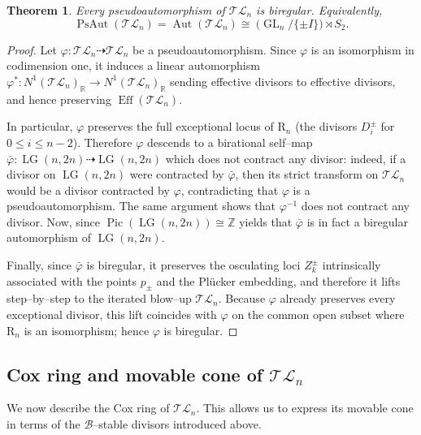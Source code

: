 \documentclass[10pt]{amsart}
\newtheorem{theorem}{Theorem}[section]
\theoremstyle{definition}
\newcommand{\R}{\mathbb{R}}
\newcommand{\Z}{\mathbb{Z}}
\newcommand{\Pic}{\operatorname{Pic}}
\newcommand{\Eff}{\operatorname{Eff}}
\newcommand{\PsAut}{\operatorname{PsAut}}
\newcommand{\Aut}{\operatorname{Aut}}
\newcommand{\LG}{\operatorname{LG}}
\newcommand{\TL}{\mathcal{TL}}
\newcommand{\GL}{\operatorname{GL}}
\newcommand{\RL}{\mathrm{R}}
\theoremstyle{plain} %
\begin{document}
\begin{theorem}\label{thm:PsAut-equals-Aut}
Every pseudoautomorphism of $\TL_n$ is biregular.  Equivalently,
\[
\PsAut(\TL_n)=\Aut(\TL_n) \cong\ \bigl(\GL_n/\{\pm I\}\bigr)\rtimes S_2.
\]
\end{theorem}

\begin{proof}
Let $\varphi:\TL_n\dashrightarrow \TL_n$ be a pseudoautomorphism.  Since $\varphi$ is an
isomorphism in codimension one, it induces a linear automorphism $\varphi^*:N^1(\TL_n)_\R\longrightarrow N^1(\TL_n)_\R$ sending effective divisors to effective divisors, and hence preserving
$\Eff(\TL_n)$.

In particular, $\varphi$ preserves the full exceptional locus of $\RL_n$ (the divisors
$D_i^\pm$ for $0\le i\le n-2$).  Therefore $\varphi$ descends to a birational self--map $\bar\varphi:\LG(n,2n)\dashrightarrow \LG(n,2n)$ which does not contract any divisor: indeed, if a divisor on $\LG(n,2n)$ were contracted by
$\bar\varphi$, then its strict transform on $\TL_n$ would be a divisor contracted by $\varphi$,
contradicting that $\varphi$ is a pseudoautomorphism. The same argument shows that $\varphi^{-1}$ does not contract any divisor. Now, since $\Pic(\LG(n,2n))\cong \Z$ \cite[Proposition~7.2]{Mas1} yields that $\bar\varphi$ is in fact a biregular automorphism of $\LG(n,2n)$.

Finally, since $\bar\varphi$ is biregular, it preserves the osculating loci $Z_k^\pm$
intrinsically associated with the points $p_\pm$ and the Pl\"ucker embedding, and therefore it
lifts step--by--step to the iterated blow--up $\TL_n$.  Because $\varphi$ already preserves every
exceptional divisor, this lift coincides with $\varphi$ on the common open subset where $\RL_n$
is an isomorphism; hence $\varphi$ is biregular.
\end{proof}


\subsection{Cox ring and movable cone of \texorpdfstring{$\TL_n$}{TLn}}

We now describe the Cox ring of $\TL_n$. This allows us to express its movable cone in terms of the $\mathscr{B}$--stable divisors introduced above.
\end{document}
